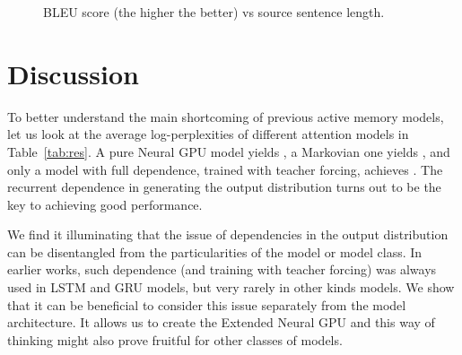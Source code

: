 \documentclass{article}
\begin{document}
\begin{figure}\begin{center}
\end{center}

\caption{BLEU score (the higher the better) vs source sentence length.}
\label{fig:len}
\end{figure}


\section{Discussion} \label{sec:discuss}

To better understand the main shortcoming of previous active memory
models, let us look at the average log-perplexities of different
attention models in Table~\ref{tab:res}. A pure Neural GPU model
yields , a Markovian one yields , and only a model with
full dependence, trained with teacher forcing, achieves .
The recurrent dependence in generating the output distribution
turns out to be the key to achieving good performance.

We find it illuminating that the issue of dependencies in the output
distribution can be disentangled from the particularities of the
model or model class. In earlier works, such dependence (and training
with teacher forcing) was always used in LSTM and GRU models, but
very rarely in other kinds models. We show that it can be beneficial
to consider this issue separately from the model architecture.
It allows us to create the Extended Neural GPU and this way of
thinking might also prove fruitful for other classes of models.
\end{document}
